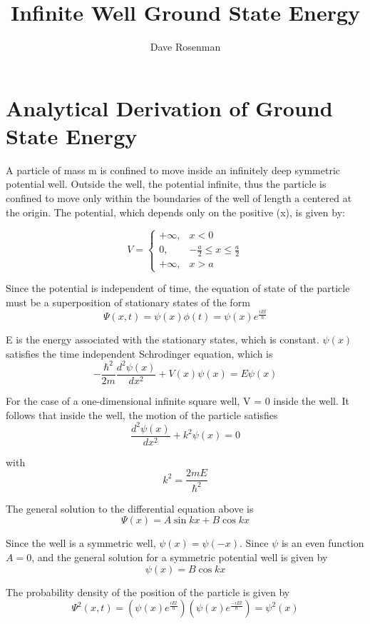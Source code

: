 \documentclass{article}
\title{Infinite Well Ground State Energy}
\author{Dave Rosenman}
\date{}
\begin{document}
	\maketitle
	\tableofcontents
	\newpage
	
\section{Analytical Derivation of Ground State Energy}
A particle of mass $\mathrm{m}$ is confined to move inside an infinitely deep symmetric potential well. Outside the well, the potential infinite, thus the particle is confined to move only within the boundaries of the well of length $\mathrm{a}$ centered at the origin. The potential, which depends only on the positive (x), is given by:

$$V = \left\{ {\begin{array}{*{20}{c}}
	{ + \infty ,}&{x < 0}\\
	{0,}&{ - \frac{a}{2} \le x \le \frac{a}{2}}\\
	{ + \infty ,}&{x > a}
	\end{array}} \right.$$

Since the potential is independent of time, the equation of state of the particle must be a superposition of stationary states of the form
$$\Psi(x,t) = \psi(x)\phi (t)=\psi (x) e^{\frac{iEt}{\hbar}}$$

E is the energy associated with the stationary states, which is constant. $\psi(x)$ satisfies the time independent Schrodinger equation, which is 
$$-\frac{\hbar^2}{2m}\frac{d^2 \psi (x)}{dx^2} + V(x) \psi(x) = E \psi(x)$$

For the case of a one-dimensional infinite square well, V = 0 inside the well. It follows that inside the well, the motion of the particle satisfies
$$\frac{d^2 \psi (x)}{dx^2} + k^2 \psi(x) = 0$$

with
$$k^2 = \frac{2mE}{\hbar^2}$$

The general solution to the differential equation above is
$$\Psi(x) = A \sin{kx} + B \cos{kx}$$

Since the well is a symmetric well, $\psi(x) = \psi(-x)$. Since $\psi$ is an even function $A=0$, and the general solution for a symmetric potential well is given by
$$\psi(x) = B\cos{kx}$$

The probability density of the position of the particle is given by
$$\Psi^2 (x,t) = \left(\psi(x) e^\frac{iEt}{\hbar}\right)\left(\psi(x)e^\frac{-iEt}{\hbar}\right) = \psi^2(x)$$
\end{document}
